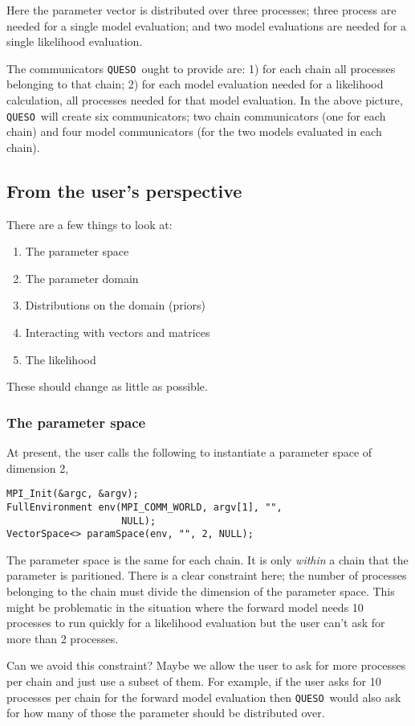 \documentclass{article}
\newcommand{\Queso}{\texttt{QUESO}}
\begin{document}
%
Here the parameter vector is distributed over three processes; three process
are needed for a single model evaluation; and two model evaluations are needed
for a single likelihood evaluation.

The communicators \Queso\ ought to provide are: 1) for each chain all processes
belonging to that chain; 2) for each model evaluation needed for a likelihood
calculation, all processes needed for that model evaluation.  In the above
picture, \Queso\ will create six communicators; two chain communicators (one
for each chain) and four model communicators (for the two models evaluated
in each chain).

\subsection{From the user's perspective}

There are a few things to look at:
\begin{enumerate}
  \item The parameter space
  \item The parameter domain
  \item Distributions on the domain (priors)
  \item Interacting with vectors and matrices
  \item The likelihood
\end{enumerate}
These should change as little as possible.

\subsubsection{The parameter space}

At present, the user calls the following to instantiate a parameter space of
dimension 2,
\begin{lstlisting}
MPI_Init(&argc, &argv);
FullEnvironment env(MPI_COMM_WORLD, argv[1], "",
                    NULL);
VectorSpace<> paramSpace(env, "", 2, NULL);
\end{lstlisting}
The parameter space is the same for each chain.  It is only \emph{within} a
chain that the parameter is paritioned.  There is a clear constraint here; the
number of processes belonging to the chain must divide the dimension of the
parameter space.  This might be problematic in the situation where the forward
model needs 10 processes to run quickly for a likelihood evaluation but the
user can't ask for more than 2 processes.

Can we avoid this constraint?  Maybe we allow the user to ask for more
processes per chain and just use a subset of them.  For example, if the user
asks for 10 processes per chain for the forward model evaluation then \Queso\
would also ask for how many of those the parameter should be distributed over.
\end{document}
